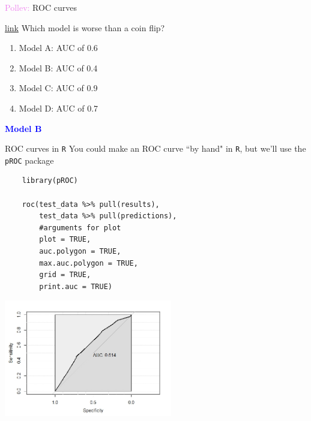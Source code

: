\documentclass[10pt,t]{beamer}
\begin{document}
\begin{frame}{\textcolor{violet}{Pollev:} ROC curves}
	
	\textcolor{violet}{\href{https://PollEv.com/multiple_choice_polls/2v8nB4YNfYWJKa2Hwzq2h/respond}{link}} Which model is worse than a coin flip?
	
	\bigskip
	
	\begin{enumerate}
		\item Model A: AUC of 0.6
		\medskip
		\item Model B: AUC of 0.4
		\medskip
		\item Model C: AUC of 0.9
		\medskip
		\item  Model D: AUC of 0.7
	\end{enumerate}
	\pause
	\bigskip
	\textbf{\textcolor{blue}{Model B}}
\end{frame}


\begin{frame}[fragile]{ROC curves in \texttt{R}}
	\vspace{-0.7cm}
	You could make an ROC curve ``by hand" in \texttt{R}, but we'll use the \texttt{pROC} package
	
	\medskip
	\footnotesize
	\begin{verbatim}
	library(pROC)
	
	roc(test_data %>% pull(results),
	    test_data %>% pull(predictions),
	    #arguments for plot
	    plot = TRUE,
	    auc.polygon = TRUE,
	    max.auc.polygon = TRUE,
	    grid = TRUE,
	    print.auc = TRUE)  
	  	\end{verbatim}
	  	
	  	\vspace{-6 mm}
	  	
	\begin{center}
	\includegraphics[width=0.55\textwidth]{figs/hiv_roc}
\end{center}
\end{frame}
\end{document}
